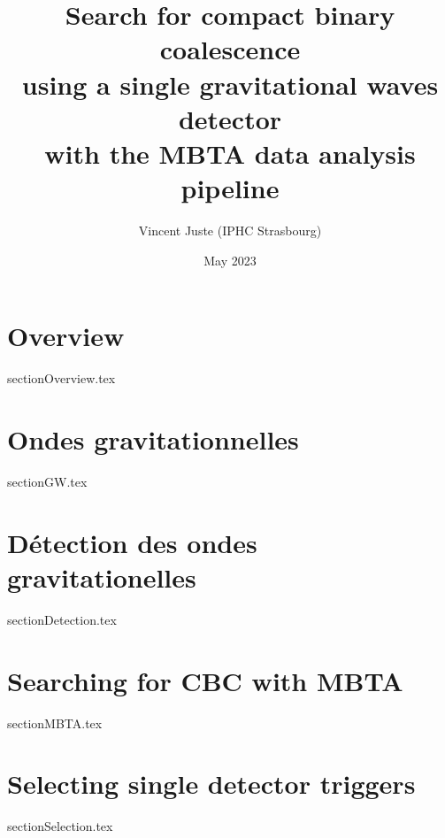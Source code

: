 \documentclass[12pt]{article}
\title{Search for compact binary coalescence\\ using a single gravitational waves detector\\ with the MBTA data analysis pipeline}
\author{Vincent Juste (IPHC Strasbourg)}
\date{May 2023}
\begin{document}
\dosecttoc



\tableofcontents


\clearpage
\newpage
\section{Overview}
\label{section:overview}
\secttoc
{sectionOverview.tex}




\clearpage
\newpage
\section{Ondes gravitationnelles}
\label{section:intro_gw}
\secttoc
{sectionGW.tex}






\clearpage
\newpage
\section{Détection des ondes gravitationelles}
\label{section:detection}
\secttoc
{sectionDetection.tex}





\clearpage
\newpage
\section{Searching for CBC with MBTA}
\label{section:mbta}
\secttoc
{sectionMBTA.tex}






\clearpage
\newpage
\section{Selecting single detector triggers}
\label{section:selection}
\secttoc
{sectionSelection.tex}




\clearpage
\newpage
\end{document}
